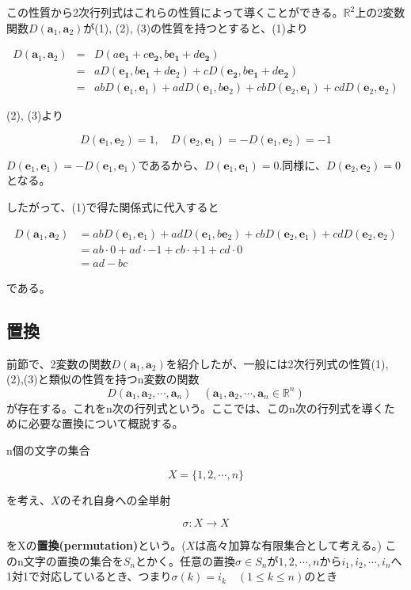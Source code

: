 \documentclass[dvipdfmx,autodetect-engine]{jsarticle}
\newcommand{\vecSpace}[1]{\mathbb{R}^{#1}}
\begin{document}
この性質から2次行列式はこれらの性質によって導くことができる。$\vecSpace{2}$上の2変数関数$D(\bm{a}_1, \bm{a}_2)$が(1), (2), (3)の性質を持つとすると、(1)より

\begin{eqnarray*}
D(\bm{a}_1, \bm{a}_2) &= &D(a\bm{e_1} + c\bm{e_2}, b\bm{e_1} + d\bm{e_2}) \\
&= &aD(\bm{e_1}, b\bm{e_1} + d \bm{e}_2) + cD(\bm{e_2}, b\bm{e_1} + d\bm{e_2}) \\
&= &abD(\bm{e}_1, \bm{e}_1) + adD(\bm{e}_1, b\bm{e}_2) + cbD(\bm{e}_2, \bm{e}_1) + cdD(\bm{e}_2, \bm{e}_2)
\end{eqnarray*}

(2), (3)より

$$
D(\bm{e}_1, \bm{e}_2) = 1, \quad D(\bm{e}_2, \bm{e}_1) = -D(\bm{e}_1, \bm{e}_2) = -1
$$

$D(\bm{e}_1, \bm{e}_1) = -D(\bm{e}_1, \bm{e}_1)$であるから、$D(\bm{e}_1, \bm{e}_1) = 0$.同様に、$D(\bm{e}_2, \bm{e}_2) = 0$となる。

したがって、(1)で得た関係式に代入すると

\begin{equation*}
\begin{split}
D(\bm{a}_1, \bm{a}_2) &= abD(\bm{e}_1, \bm{e}_1) + adD(\bm{e}_1, b\bm{e}_2) + cbD(\bm{e}_2, \bm{e}_1) + cdD(\bm{e}_2, \bm{e}_2) \\
&= ab \cdot 0 + ad \cdot -1 + cb \cdot + 1 + cd \cdot 0 \\
&= ad - bc
\end{split}
\end{equation*}

である。

\subsection{置換}

前節で、2変数の関数$D(\bm{a}_1, \bm{a}_2)$を紹介したが、一般には2次行列式の性質(1),(2),(3)と類似の性質を持つn変数の関数
$$
D(\bm{a}_1, \bm{a}_2, \cdots, \bm{a}_n) \quad (\bm{a}_1, \bm{a}_2, \cdots, \bm{a}_n \in \vecSpace{n})
$$
が存在する。これをn次の行列式という。ここでは、このn次の行列式を導くために必要な置換について概説する。

n個の文字の集合

$$
X = \{1, 2, \cdots, n\}
$$

を考え、$X$のそれ自身への全単射

$$
\sigma: X \to X
$$

をXの{\bf 置換(permutation)}という。($X$は高々加算な有限集合として考える。)
このn文字の置換の集合を$S_n$とかく。任意の置換$\sigma \in S_n$が$1, 2, \cdots, n$から$i_1, i_2, \cdots, i_n$へ1対1で対応しているとき、つまり$\sigma(k) = i_k \quad (1 \leq k \leq n)$のとき
\end{document}
